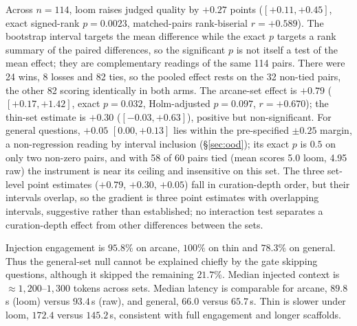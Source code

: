 \documentclass[10pt,twocolumn]{article}
\begin{document}
Across $n=114$, loom raises judged quality by $\mathbf{+0.27}$ points ($[+0.11,+0.45]$, exact signed-rank $p=0.0023$, matched-pairs rank-biserial $r=+0.589$). The bootstrap interval targets the mean difference while the exact $p$ targets a rank summary of the paired differences, so the significant $p$ is not itself a test of the mean effect; they are complementary readings of the same 114 pairs. There were 24 wins, 8 losses and 82 ties, so the pooled effect rests on the 32 non-tied pairs, the other 82 scoring identically in both arms. The arcane-set effect is $\mathbf{+0.79}$ ($[+0.17,+1.42]$, exact $p=0.032$, Holm-adjusted $p=0.097$, $r=+0.670$); the thin-set estimate is $+0.30$ ($[-0.03,+0.63]$), positive but non-significant. For general questions, $+0.05$ $[0.00,+0.13]$ lies within the pre-specified $\pm0.25$ margin, a non-regression reading by interval inclusion (\S\ref{sec:ood}); its exact $p$ is $0.5$ on only two non-zero pairs, and with 58 of 60 pairs tied (mean scores 5.0 loom, 4.95 raw) the instrument is near its ceiling and insensitive on this set. The three set-level point estimates ($+0.79$, $+0.30$, $+0.05$) fall in curation-depth order, but their intervals overlap, so the gradient is three point estimates with overlapping intervals, suggestive rather than established; no interaction test separates a curation-depth effect from other differences between the sets.

Injection engagement is $95.8\%$ on arcane, $100\%$ on thin and $78.3\%$ on general. Thus the general-set null cannot be explained chiefly by the gate skipping questions, although it skipped the remaining $21.7\%$. Median injected context is $\approx1{,}200$--$1{,}300$ tokens across sets. Median latency is comparable for arcane, $89.8$\,s (loom) versus $93.4$\,s (raw), and general, $66.0$ versus $65.7$\,s. Thin is slower under loom, $172.4$ versus $145.2$\,s, consistent with full engagement and longer scaffolds.
\end{document}

